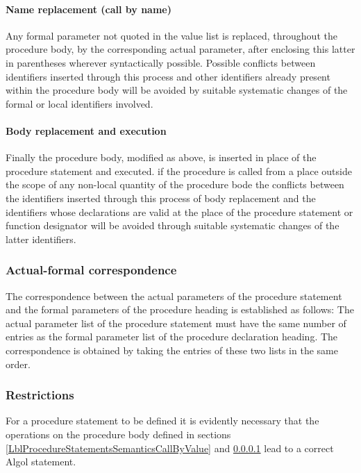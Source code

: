 \documentclass[a4paper,11pt]{article}
\begin{document}
\paragraph{Name replacement (call by name)}
\label{LblProcedureStatementsSemanticsCallByName}

Any formal parameter not quoted in the value list is replaced,
throughout the procedure body, by the corresponding actual parameter,
after enclosing this latter in parentheses wherever syntactically
possible.  Possible conflicts between identifiers inserted through
this process and other identifiers already present within the
procedure body will be avoided by suitable systematic changes of the
formal or local identifiers involved.

\paragraph{Body replacement and execution}

Finally the procedure body, modified as above, is inserted in place of
the procedure statement and executed.  if the procedure is called from
a place outside the scope of any non-local quantity of the procedure
bode the conflicts between the identifiers inserted through this
process of body replacement and the identifiers whose declarations are
valid at the place of the procedure statement or function designator
will be avoided through suitable systematic changes of the latter
identifiers.

\subsubsection{Actual-formal correspondence}

The correspondence between the actual parameters of the procedure
statement and the formal parameters of the procedure heading is
established as follows: The actual parameter list of the procedure
statement must have the same number of entries as the formal parameter
list of the procedure declaration heading.  The correspondence is
obtained by taking the entries of these two lists in the same order.

\subsubsection{Restrictions}
\label{LblProcedureStatementsRestrictions}

For a procedure statement to be defined it is evidently necessary that
the operations on the procedure body defined in sections
\ref{LblProcedureStatementsSemanticsCallByValue} and
\ref{LblProcedureStatementsSemanticsCallByName} lead to a correct
Algol statement.
\end{document}
